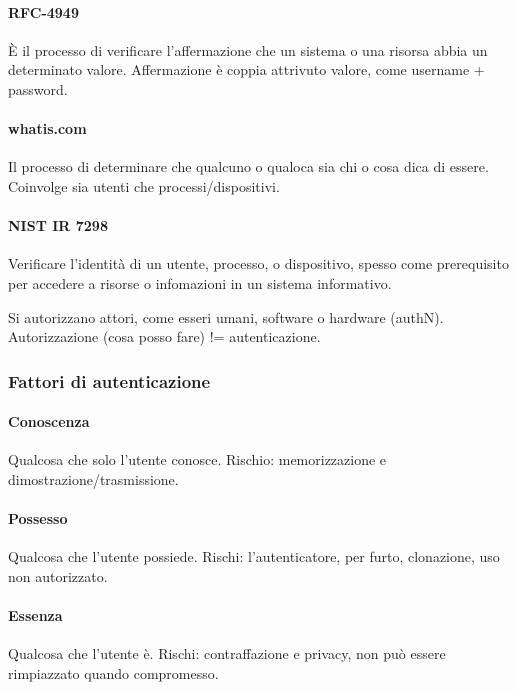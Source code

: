 \documentclass[11pt]{article}
\begin{document}
\paragraph*{RFC-4949}
È il processo di verificare l'affermazione che un sistema o una risorsa abbia un determinato valore. Affermazione è coppia 
attrivuto valore, come username + password.
\paragraph*{whatis.com}
Il processo di determinare che qualcuno o qualoca sia chi o cosa dica di essere. Coinvolge sia utenti che processi/dispositivi.
\paragraph*{NIST IR 7298}
Verificare l'identità di un utente, processo, o dispositivo, spesso come prerequisito per accedere a risorse o infomazioni 
in un sistema informativo.

Si autorizzano attori, come esseri umani, software o hardware (authN). Autorizzazione (cosa posso fare) != autenticazione.
\subsubsection{Fattori di autenticazione}
\paragraph*{Conoscenza}
Qualcosa che solo l'utente conosce. Rischio: memorizzazione e dimostrazione/trasmissione.
\paragraph*{Possesso}
Qualcosa che l'utente possiede.  Rischi: l'autenticatore, per furto, clonazione, uso non autorizzato.
\paragraph*{Essenza}
Qualcosa che l'utente è. Rischi: contraffazione e privacy, non può essere rimpiazzato quando compromesso.
\end{document}
